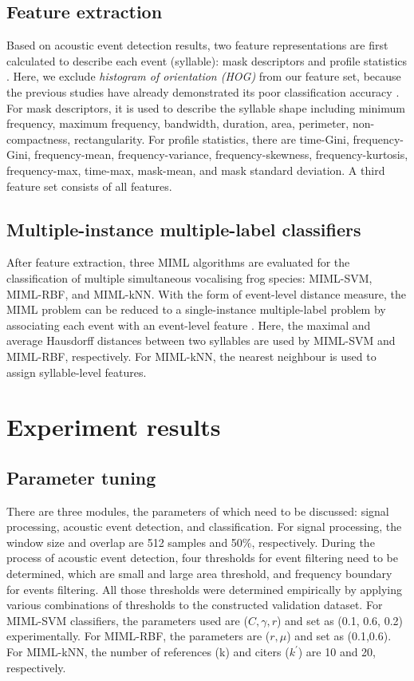 \subsection{Feature extraction}
Based on acoustic event detection results, two feature representations are first calculated to describe each event (syllable): mask descriptors and profile statistics \citep{briggs2012acoustic}. Here, we exclude \textit{histogram of orientation (HOG)} from our feature set, because the previous studies have already demonstrated its poor classification accuracy \citep{briggs2012acoustic, ruizmultiple2015}. For mask descriptors, it is used to describe the syllable shape including minimum frequency, maximum frequency, bandwidth, duration, area, perimeter, non-compactness, rectangularity. For profile statistics, there are time-Gini, frequency-Gini, frequency-mean, frequency-variance, frequency-skewness, frequency-kurtosis, frequency-max, time-max, mask-mean, and mask standard deviation. A third feature set consists of all features.







\subsection{Multiple-instance multiple-label classifiers}
After feature extraction, three MIML algorithms are evaluated for the classification of multiple simultaneous vocalising frog species: MIML-SVM, MIML-RBF, and MIML-kNN. With the form of event-level distance measure, the MIML problem can be reduced to a single-instance multiple-label problem by associating each event with an event-level feature \citep{briggs2012acoustic}. Here, the maximal and average Hausdorff distances between two syllables are used by MIML-SVM and MIML-RBF, respectively. For MIML-kNN, the nearest neighbour is used to assign syllable-level features. 


\section{Experiment results}

\subsection{Parameter tuning}
There are three modules, the parameters of which need to be discussed: signal processing, acoustic event detection, and classification. For signal processing, the window size and overlap are 512 samples and 50\%, respectively. During the process of acoustic event detection, four thresholds for event filtering need to be determined, which are small and large area threshold, and frequency boundary for events filtering. All those thresholds were determined empirically by applying various combinations of thresholds to the constructed validation dataset. For MIML-SVM classifiers, the parameters used are ($C,\gamma,r$) and set as (0.1, 0.6, 0.2) experimentally. For MIML-RBF, the parameters are ($ r, \mu$) and set as (0.1,0.6). For MIML-kNN, the number of references (k) and citers ($k^{'}$) are 10 and 20, respectively.
 
